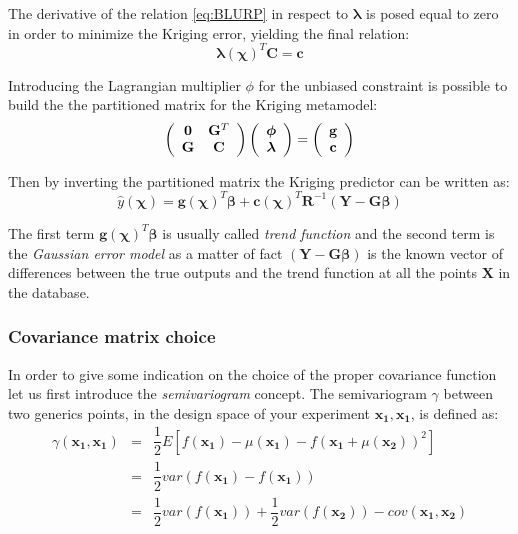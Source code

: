 The derivative of the relation \eqref{eq:BLURP} in respect to $\boldsymbol{ \lambda}$ is posed equal to zero in order to minimize the Kriging error, yielding the final relation:
\begin{equation}
\boldsymbol{\lambda}(\boldsymbol{\chi})^T \mathbf{C} = \mathbf{c}
\end{equation}

Introducing the Lagrangian multiplier $\phi$ for the unbiased constraint is possible to build the the partitioned matrix for the Kriging metamodel:
\begin{equation}
\left(
\begin{array}{c c}
\mathbf{0} & \mathbf{G}^T \\
\mathbf{G} & \mathbf{C}
\end{array}
\right)  \left( 
\begin{array}{c}
\boldsymbol{\phi} \\
\boldsymbol{\lambda}
\end{array}
\right) = \left( 
\begin{array}{c}
\mathbf{g} \\
\mathbf{c}
\end{array}
\right)
\end{equation}

Then by inverting the partitioned matrix the Kriging predictor can be written as:
\begin{equation}
\hat{y}(\boldsymbol{\chi}) = \mathbf{g}(\boldsymbol{\chi})^T \boldsymbol{\beta} + \mathbf{c}(\boldsymbol{\chi})^T \mathbf{R}^{-1} \left( \mathbf{Y} - \mathbf{G}\boldsymbol{\beta} \right)
\end{equation}

The first term $\mathbf{g}(\boldsymbol{\chi})^T \boldsymbol{\beta}$ is usually called \textit{trend function} and the second term is the \textit{Gaussian error model} as a matter of fact $\left( \mathbf{Y} - \mathbf{G}\boldsymbol{\beta} \right)$ is the known vector of differences between the true outputs and the trend function at all the points $\mathbf{X}$ in the database.


\subsubsection{Covariance matrix choice}
\label{sec:cov}

In order to give some indication on the choice of the proper covariance function let us first introduce the \textit{semivariogram} concept.
The semivariogram $\gamma$ between two generics points, in the design space of your experiment $\mathbf{x_1}, \mathbf{x_1}$, is defined as:
\begin{eqnarray}
\gamma(\mathbf{x_1}, \mathbf{x_1}) &=& \dfrac{1}{2} E \left[  f(\mathbf{x_1}) -\mu(\mathbf{x_1}) -f(\mathbf{x_1} +\mu(\mathbf{x_2}))^2 \right] \label{eq_semvar1}\\
&=& \dfrac{1}{2} var(f(\mathbf{x_1}) -f(\mathbf{x_1}) ) \nonumber \\
&=& \dfrac{1}{2} var(f(\mathbf{x_1}))  +\dfrac{1}{2} var(f(\mathbf{x_2})) -cov(\mathbf{x_1}, \mathbf{x_2}) \label{eq_semvar2}
\end{eqnarray}

